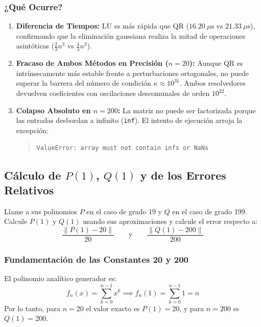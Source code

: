 \documentclass[11pt,a4paper]{article}
\theoremstyle{definition}
\theoremstyle{remark}
\begin{document}
\subsubsection{¿Qué Ocurre?}
\begin{enumerate}[leftmargin=*]
    \item \textbf{Diferencia de Tiempos:} LU es más rápida que QR ($16.20\ \mu\text{s}$ vs $21.33\ \mu\text{s}$), confirmando que la eliminación gaussiana realiza la mitad de operaciones asintóticas ($\frac{2}{3}n^3$ vs $\frac{4}{3}n^3$).
    \item \textbf{Fracaso de Ambos Métodos en Precisión ($n = 20$):} Aunque QR es intrínsecamente más estable frente a perturbaciones ortogonales, no puede superar la barrera del número de condición $\kappa \approx 10^{31}$. Ambos resolvedores devuelven coeficientes con oscilaciones descomunales de orden $10^{22}$.
    \item \textbf{Colapso Absoluto en $n = 200$:} La matriz no puede ser factorizada porque las entradas desbordan a infinito (\texttt{inf}). El intento de ejecución arroja la excepción:
    \begin{quote}
        \texttt{ValueError: array must not contain infs or NaNs}
    \end{quote}
\end{enumerate}

\subsection{Cálculo de $P(1)$, $Q(1)$ y de los Errores Relativos}

\begin{solbox}
Llame a sus polinomios $P$ en el caso de grado 19 y $Q$ en el caso de grado 199. Calcule $P(1)$ y $Q(1)$ usando sus aproximaciones y calcule el error respecto a:
\begin{equation}
    \frac{\|P(1) - 20\|}{20} \qquad \text{y} \qquad \frac{\|Q(1) - 200\|}{200}
\end{equation}
\end{solbox}

\subsubsection{Fundamentación de las Constantes 20 y 200}
El polinomio analítico generador es:
\begin{equation}
    f_n(x) = \sum_{k=0}^{n-1} x^k \implies f_n(1) = \sum_{k=0}^{n-1} 1 = n
\end{equation}
Por lo tanto, para $n = 20$ el valor exacto es $P(1) = 20$, y para $n = 200$ es $Q(1) = 200$.
\end{document}
